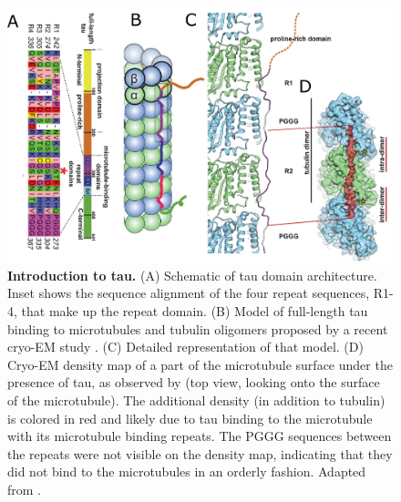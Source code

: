 \begin{figure}[h!tb]
\centering
\includegraphics[scale=0.93]{Figures/tau.png}
\caption[Introduction to tau.]{\textbf{Introduction to tau.}
(A) Schematic of tau domain architecture. Inset shows the sequence alignment of the four repeat sequences, R1-4, that make up the repeat domain. (B) Model of full-length tau binding to microtubules and tubulin oligomers proposed by a recent cryo-EM study \parencite{Kellogg2018}. (C) Detailed representation of that model. (D) Cryo-EM density map of a part of the microtubule surface under the presence of tau, as observed by \cite{Kellogg2018} (top view, looking onto the surface of the microtubule). The additional density (in addition to tubulin) is colored in red and likely due to tau binding to the microtubule with its microtubule binding repeats. The PGGG sequences between the repeats were not visible on the density map, indicating that they did not bind to the microtubules in an orderly fashion. Adapted from \cite{Kellogg2018}. 
	}\label{tau}
\end{figure}

